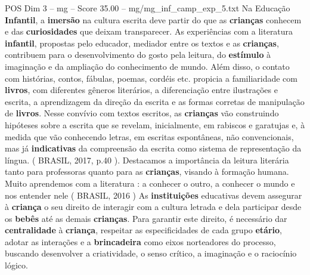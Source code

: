 \begin{textsample}{POS Dim 3 – mg – Score 35.00 – mg/mg\_inf\_camp\_exp\_5.txt}
Na Educação \textbf{Infantil}, a \textbf{imersão} na cultura escrita deve partir do que as \textbf{crianças} conhecem e das \textbf{curiosidades} que deixam transparecer.
As experiências com a literatura \textbf{infantil}, propostas pelo educador, mediador entre os textos e as \textbf{crianças}, contribuem para o desenvolvimento do gosto pela leitura, do \textbf{estímulo} à imaginação e da ampliação do conhecimento de mundo.
Além disso, o contato com histórias, contos, fábulas, poemas, cordéis etc. propicia a familiaridade com \textbf{livros}, com diferentes gêneros literários, a diferenciação entre ilustrações e escrita, a aprendizagem da direção da escrita e as formas corretas de manipulação de \textbf{livros}.
Nesse convívio com textos escritos, as \textbf{crianças} vão construindo hipóteses sobre a escrita que se revelam, inicialmente, em rabiscos e garatujas e, à medida que vão conhecendo letras, em escritas espontâneas, não convencionais, mas já \textbf{indicativas} da compreensão da escrita como sistema de representação da língua. ( BRASIL, 2017, p.40 ).
Destacamos a importância da leitura literária tanto para professoras quanto para as \textbf{crianças}, visando à formação humana.
Muito aprendemos com a literatura : a conhecer o outro, a conhecer o mundo e nos entender nele ( BRASIL, 2016 ) As \textbf{instituições} educativas devem assegurar à \textbf{criança} o seu direito de interagir com a cultura letrada e dela participar desde os \textbf{bebês} até as demais \textbf{crianças}.
Para garantir este direito, é necessário dar \textbf{centralidade} à \textbf{criança}, respeitar as especificidades de cada grupo \textbf{etário}, adotar as interações e a \textbf{brincadeira} como eixos norteadores do processo, buscando desenvolver a criatividade, o senso crítico, a imaginação e o raciocínio lógico.

\end{textsample}
